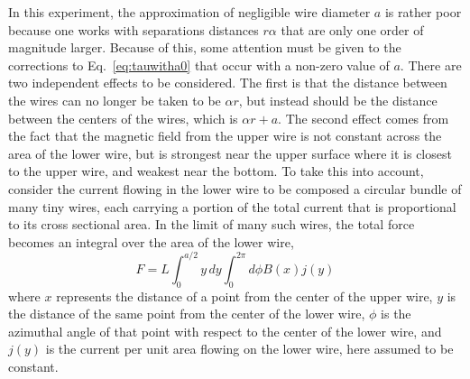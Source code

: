 \documentclass{revtex4}
\begin{document}
In this experiment, the approximation of negligible wire diameter $a$
is rather poor because one works with separations distances $r\alpha$
that are only one order of magnitude larger.  Because of this, some
attention must be given to the corrections to Eq.~\ref{eq:tauwitha0}
that occur with a non-zero value of $a$.  There are two independent
effects to be considered.  The first is that the distance between the
wires can no longer be taken to be $\alpha r$, but instead should be
the distance between the centers of the wires, which is $\alpha r+a$.
The second effect comes from the fact that the magnetic field from the
upper wire is not constant across the area of the lower wire, but is
strongest near the upper surface where it is closest to the upper wire,
and weakest near the bottom.  To take this into account, consider the
current flowing in the lower wire to be composed a circular bundle of
many tiny wires, each carrying a portion of the total current that is
proportional to its cross sectional area.  In the limit of many such
wires, the total force becomes an integral over the area of the lower
wire,
\begin{equation}
F= L\int_0^{a/2}y\,dy \int_0^{2\pi}d\phi B(x) j(y)
\end{equation}
where $x$ represents the distance of a point from the center of the
upper wire, $y$ is the distance of the same point from the center of
the lower wire, $\phi$ is the azimuthal angle of that point with
respect to the center of the lower wire, and $j(y)$ is the current
per unit area flowing on the lower wire, here assumed to be constant.
\end{document}
